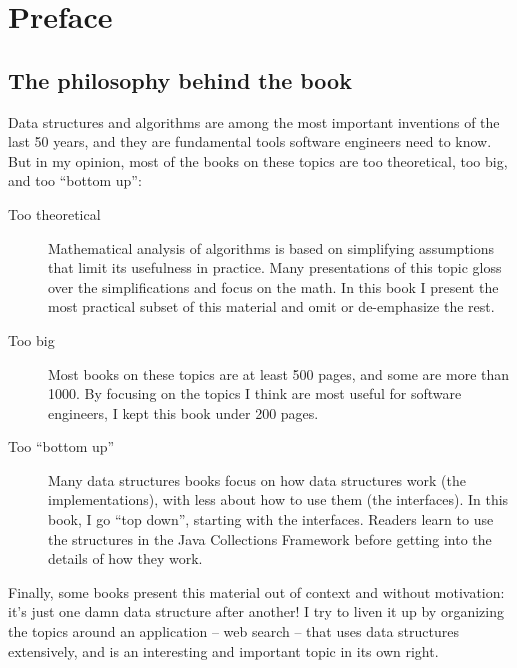 \documentclass[12pt]{book}
\theoremstyle{exercise}
\begin{document}

\fi


\chapter*{Preface}
\label{preface}



\section*{The philosophy behind the book}

Data structures and algorithms are among the most important inventions
of the last 50 years, and they are fundamental tools software
engineers need to know.  But in my opinion, most of the books on these
topics are too theoretical, too big, and too ``bottom up'':

\begin{description}

\item[Too theoretical]  Mathematical analysis of algorithms is based
on simplifying assumptions that limit its usefulness in practice.
Many presentations of this topic gloss over the simplifications and
focus on the math.  In this book I present the most practical subset
of this material and omit or de-emphasize the rest.

\item[Too big] Most books on these topics are at least 500 pages,
and some are more than 1000.  By focusing on the topics I think are
most useful for software engineers, I kept this book under
200 pages.


\item[Too ``bottom up''] Many data structures books focus on how data
  structures work (the implementations), with less about how to use
  them (the interfaces).  In this book, I go ``top down'', starting
  with the interfaces.  Readers learn to use the structures in the
  Java Collections Framework before getting into the details of how
  they work.

\end{description}

Finally, some books present this material out of context and without
motivation: it's just one damn data structure after another!
I try to liven it up by organizing the topics around an
application -- web search -- that uses data structures extensively,
and is an interesting and important topic in its own right.
\end{document}
